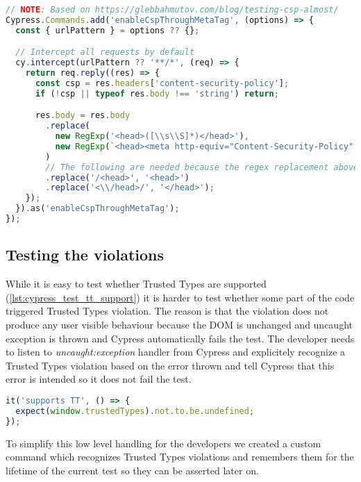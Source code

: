 \bigskip
\begin{lstlisting}[language=JavaScript, caption=Intercept requests and enable CSP header inside via meta tag]
// NOTE: Based on https://glebbahmutov.com/blog/testing-csp-almost/
Cypress.Commands.add('enableCspThroughMetaTag', (options) => {
  const { urlPattern } = options ?? {};

  // Intercept all requests by default
  cy.intercept(urlPattern ?? '**/*', (req) => {
    return req.reply((res) => {
      const csp = res.headers['content-security-policy'];
      if (!csp || typeof res.body !== 'string') return;

      res.body = res.body
        .replace(
          new RegExp('<head>([\\s\\S]*)</head>'),
          new RegExp(`<head><meta http-equiv="Content-Security-Policy" content="${csp}">$1</head>`).toString()
        )
        // The following are needed because the regex replacement above inserts some characters
        .replace('/<head>', '<head>')
        .replace('<\\/head>/', '</head>');
    });
  }).as('enableCspThroughMetaTag');
});
\end{lstlisting}

\subsection{Testing the violations}

While it is easy to test whether Trusted Types are supported (\ref{lst:cypress_test_tt_support}) it
is harder to test whether some part of the code triggered Trusted Types violation. The reason is
that the violation does not produce any user visible behaviour because the DOM is unchanged and
uncaught exception is thrown and Cypress automatically fails the test. The developer needs to listen
to \emph{uncaught:exception} handler from Cypress and explicitely recognize a Trusted Types
violation based on the error thrown and tell Cypress that this error is intended so it does not fail
the test.

\bigskip
\begin{lstlisting}[language=JavaScript, caption=Test Trusted Types support, label={lst:cypress_test_tt_support}]
it('supports TT', () => {
  expect(window.trustedTypes).not.to.be.undefined;
});
\end{lstlisting}

To simplify this low level handling for the developers we created a custom command which
recognizes Trusted Types violations and remembers them for the lifetime of the current test so they
can be asserted later on.

